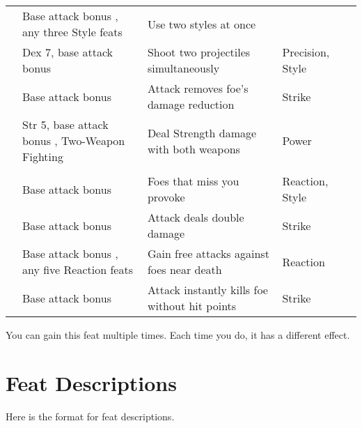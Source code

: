 {\begin{longtabu}{>{\lcol}p{10em} >{\lcol}p{15em} >{\lcol}X >{\lcol}p{6em} >{\lcol}p{3em}}
         & Base attack bonus , any three Style feats & Use two styles at once & \x &  \\
         & Dex 7, base attack bonus  & Shoot two projectiles simultaneously & Precision, Style &  \\
         & Base attack bonus  & Attack removes foe's damage reduction & Strike &  \\
         & Str 5, base attack bonus , Two-Weapon Fighting & Deal Strength damage with both weapons & Power &  \\

        \midrule
         &  &  &  &  \\
         & Base attack bonus  & Foes that miss you provoke & Reaction, Style&  \\
         & Base attack bonus  & Attack deals double damage & Strike &  \\
         & Base attack bonus , any five Reaction feats & Gain free attacks against foes near death & Reaction &  \\
         & Base attack bonus  & Attack instantly kills foe without hit points & Strike &  \\
    \end{longtabu}
    \begin{enumerate*}
        \item You can gain this feat multiple times. Each time you do, it has a different effect.
    \end{enumerate*}
}%

\twocolumn

\section{Feat Descriptions}
Here is the format for feat descriptions.

